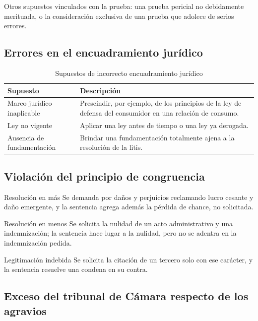 \documentclass[12pt,oneside]{book}
\begin{document}
Otros supuestos vinculados con la prueba: una prueba pericial no debidamente merituada, o la consideración exclusiva de una prueba que adolece de serios errores.

\subsection{Errores en el encuadramiento jurídico}

\begin{table}[H]
\centering
\caption{Supuestos de incorrecto encuadramiento jurídico}
\begin{tabularx}{\textwidth}{Q{0.28\textwidth}Y}
\toprule
\textbf{Supuesto} & \textbf{Descripción} \\
\midrule
Marco jurídico inaplicable & Prescindir, por ejemplo, de los principios de la ley de defensa del consumidor en una relación de consumo. \\
Ley no vigente & Aplicar una ley antes de tiempo o una ley ya derogada. \\
Ausencia de fundamentación & Brindar una fundamentación totalmente ajena a la resolución de la litis. \\
\bottomrule
\end{tabularx}
\end{table}

\subsection{Violación del principio de congruencia}

\begin{example}{Resolución en más}
Se demanda por daños y perjuicios reclamando lucro cesante y daño emergente, y la sentencia agrega además la pérdida de chance, no solicitada.
\end{example}

\begin{example}{Resolución en menos}
Se solicita la nulidad de un acto administrativo y una indemnización; la sentencia hace lugar a la nulidad, pero no se adentra en la indemnización pedida.
\end{example}

\begin{example}{Legitimación indebida}
Se solicita la citación de un tercero solo con ese carácter, y la sentencia resuelve una condena en su contra.
\end{example}

\subsection{Exceso del tribunal de Cámara respecto de los agravios}
\end{document}
